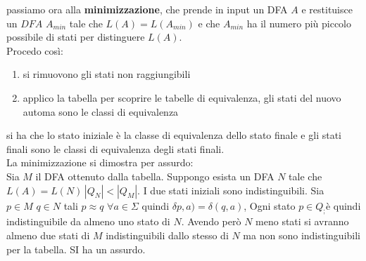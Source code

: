 	passiamo ora alla \textbf{minimizzazione}, che prende in input un DFA $A$ e restituisce un $DFA$ $A_{min}$ tale che $L(A)=L(A_{min})$ e che $A_{min}$ ha il numero più piccolo possibile di stati per distinguere $L(A)$.\\
	Procedo così:
	\begin{enumerate}
		\item si rimuovono gli stati non raggiungibili
		\item applico la tabella per scoprire le tabelle di equivalenza, gli stati del nuovo automa sono le classi di equivalenza
	\end{enumerate}
	si ha che lo stato iniziale è la classe di equivalenza dello stato finale e gli stati finali sono le classi di equivalenza degli stati finali.\\
	La minimizzazione si dimostra per assurdo:\\
	Sia $M$ il DFA ottenuto dalla tabella. Suppongo esista un DFA $N$ tale che $L(A)=L(N)\,|Q_N|<|Q_M|$. I due stati iniziali sono indistinguibili. Sia $p\in M\,\,q\in N$ tali $p\approx q\,\, \forall a\in\Sigma$ quindi $\delta p,a)=\delta(q,a)$, Ogni stato $p\in Q_;$è quindi indistinguibile da almeno uno stato di $N$. Avendo però $N$ meno stati si avranno almeno due stati di $M$ indistinguibili dallo stesso di $N$ ma non sono indistinguibili per la tabella. SI ha un assurdo.
